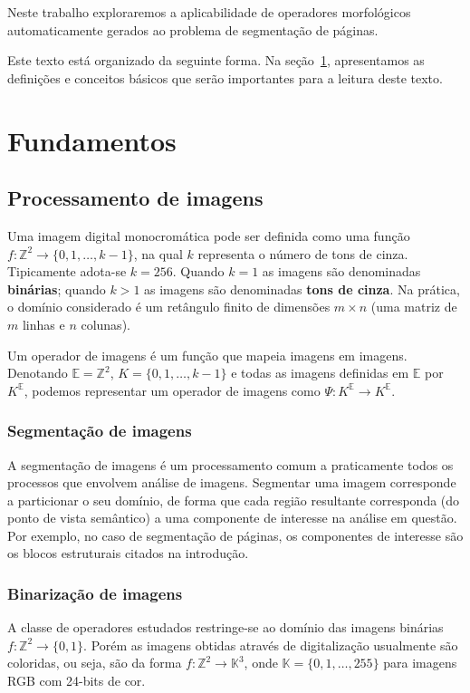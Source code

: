 \documentclass[a4paper,11pt]{article}
\begin{document}
Neste trabalho exploraremos a aplicabilidade de operadores
morfológicos automaticamente gerados ao problema de segmentação de
páginas.

Este texto está organizado da seguinte forma. Na seção~\ref{sec:fundamentos},
apresentamos as definições e conceitos básicos que serão importantes
para a leitura deste texto.

\section{Fundamentos}
\label{sec:fundamentos}

\subsection{Processamento de imagens}
Uma imagem digital monocromática pode ser definida como uma função $f:
\mathbb{Z}^2 \to \{0,1,\ldots,k-1\}$, na qual $k$ representa o número
  de tons de cinza. Tipicamente adota-se $k=256$. Quando $k=1$ as
  imagens são denominadas {\bf binárias}; quando $k>1$ as imagens são
  denominadas {\bf tons de cinza}. Na prática, o domínio considerado é
  um retângulo finito de dimensões $m\times n$ (uma matriz de $m$
  linhas e $n$ colunas). 

Um operador de imagens é um função que mapeia imagens em
imagens. Denotando $\mathbb{E}=\mathbb{Z}^2$, $K=\{0,1,\ldots,k-1\}$ e
todas as imagens definidas em $\mathbb{E}$ por $K^{\mathbb{E}}$,
  podemos representar um operador de imagens como $\Psi: K^{\mathbb{E}}
    \to K^{\mathbb{E}}$.


\subsubsection{Segmentação de imagens}
A segmentação de imagens é um processamento comum a praticamente
todos os processos que envolvem análise de imagens. Segmentar uma
imagem corresponde a particionar o seu domínio, de forma que cada
região resultante corresponda (do ponto de vista semântico) a uma
componente de interesse na análise em questão. Por exemplo, no caso de
segmentação de páginas, os componentes de interesse são os blocos
estruturais citados na introdução.

\subsubsection{Binarização de imagens}

A classe de operadores estudados restringe-se ao domínio das imagens binárias $f: \mathbb{Z}^2 \to \{0,1\}$. Porém as imagens obtidas através de digitalização usualmente são coloridas, ou seja, são da forma $f: \mathbb{Z}^2 \to \mathbb{K}^3$, onde $\mathbb{K} = \{0, 1, \ldots, 255\}$ para imagens RGB com 24-bits de cor.
\end{document}
